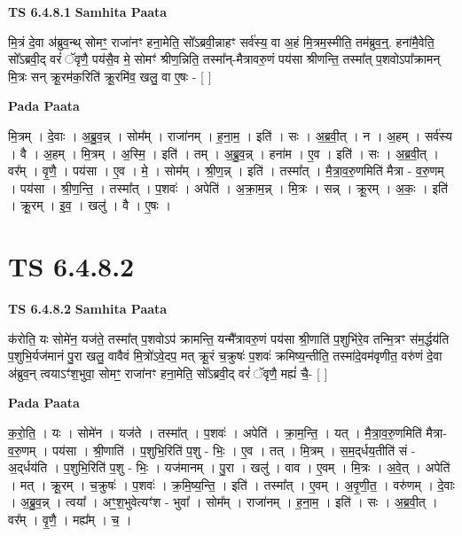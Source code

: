 \documentclass[17pt]{extarticle}
\begin{document}
\textbf{TS 6.4.8.1 } \newline
\textbf{Samhita Paata} \newline

मि॒त्रं दे॒वा अ॑ब्रुव॒न्थ् सोमꣳ॒॒ राजा॑नꣳ हना॒मेति॒ सो᳚ऽब्रवी॒न्नाहꣳ सर्व॑स्य॒ वा अ॒हं मि॒त्रम॒स्मीति॒ तम॑ब्रुव॒न्॒. हना॑मै॒वेति॒ सो᳚ऽब्रवी॒द् वरं॑ ॅवृणै॒ पय॑सै॒व मे॒ सोमꣳ॑ श्रीण॒न्निति॒ तस्मा᳚न्-मैत्रावरु॒णं पय॑सा श्रीणन्ति॒ तस्मा᳚त् प॒शवोऽपा᳚क्रामन् मि॒त्रः सन् क्रू॒रम॑क॒रिति॑ क्रू॒रमि॑व॒ खलु॒ वा ए॒षः - [  ] \newline

\textbf{Pada Paata} \newline

मि॒त्रम् । दे॒वाः । अ॒ब्रु॒व॒न्न् । सोम᳚म् । राजा॑नम् । ह॒ना॒म॒ । इति॑ । सः । अ॒ब्र॒वी॒त् । न । अ॒हम् । सर्व॑स्य । वै । अ॒हम् । मि॒त्रम् । अ॒स्मि॒ । इति॑ । तम् । अ॒ब्रु॒व॒न्न् । हना॑म । ए॒व । इति॑ । सः । अ॒ब्र॒वी॒त् । वर᳚म् । वृ॒णै॒ । पय॑सा । ए॒व । मे॒ । सोम᳚म् । श्री॒ण॒न्न् । इति॑ । तस्मा᳚त् । मै॒त्रा॒व॒रु॒णमिति॑ मैत्रा - व॒रु॒णम् । पय॑सा । श्री॒ण॒न्ति॒ । तस्मा᳚त् । प॒शवः॑ । अपेति॑ । अ॒क्रा॒म॒न्न् । मि॒त्रः । सन्न् । क्रू॒रम् । अ॒कः॒ । इति॑ । क्रू॒रम् । इ॒व॒ । खलु॑ । वै । ए॒षः ।  \newline





\section{ TS 6.4.8.2 }

\textbf{TS 6.4.8.2 } \newline
\textbf{Samhita Paata} \newline

क॑रोति॒ यः सोमे॑न॒ यज॑ते॒ तस्मा᳚त् प॒शवोऽप॑ क्रामन्ति॒ यन्मै᳚त्रावरु॒णं पय॑सा श्री॒णाति॑ प॒शुभि॑रे॒व तन्मि॒त्रꣳ स॑म॒र्द्धय॑ति प॒शुभि॒र्यज॑मानं पु॒रा खलु॒ वावैवं मि॒त्रो॑ऽवे॒दप॒ मत् क्रू॒रं च॒क्रुषः॑ प॒शवः॑ क्रमिष्य॒न्तीति॒ तस्मा॑दे॒वम॑वृणीत॒ वरु॑णं दे॒वा अ॑ब्रुव॒न् त्वयाऽꣳ॑श॒भुवा॒ सोमꣳ॒॒ राजा॑नꣳ हना॒मेति॒ सो᳚ऽब्रवी॒द् वरं॑ ॅवृणै॒ मह्यं॑ चै॒- [  ] \newline

\textbf{Pada Paata} \newline

क॒रो॒ति॒ । यः । सोमे॑न । यज॑ते । तस्मा᳚त् । प॒शवः॑ । अपेति॑ । क्रा॒म॒न्ति॒ । यत् । मै॒त्रा॒व॒रु॒णमिति॑ मैत्रा-व॒रु॒णम् । पय॑सा । श्री॒णाति॑ । प॒शुभि॒रिति॑ प॒शु - भिः॒ । ए॒व । तत् । मि॒त्रम् । स॒म॒द्‌र्धय॒तीति॑ सं - अ॒द्‌र्धय॑ति । प॒शुभि॒रिति॑ प॒शु - भिः॒ । यज॑मानम् । पु॒रा । खलु॑ । वाव । ए॒वम् । मि॒त्रः । अ॒वे॒त् । अपेति॑ । मत् । क्रू॒रम् । च॒क्रुषः॑ । प॒शवः॑ । क्र॒मि॒ष्य॒न्ति॒ । इति॑ । तस्मा᳚त् । ए॒वम् । अ॒वृ॒णी॒त॒ । वरु॑णम् । दे॒वाः । अ॒ब्रु॒व॒न्न् । त्वया᳚ । अꣳ॒॒श॒भुवेत्यꣳ॑श - भुवा᳚ । सोम᳚म् । राजा॑नम् । ह॒ना॒म॒ । इति॑ । सः । अ॒ब्र॒वी॒त् । वर᳚म् । वृ॒णै॒ । मह्य᳚म् । च॒ ।  \newline
\end{document}
